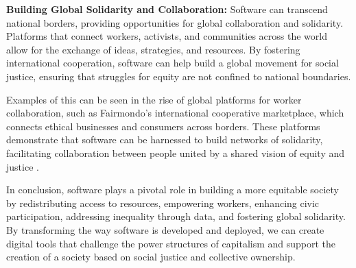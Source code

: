 \begin{refsection}
\textbf{Building Global Solidarity and Collaboration:}
Software can transcend national borders, providing opportunities for global collaboration and solidarity. Platforms that connect workers, activists, and communities across the world allow for the exchange of ideas, strategies, and resources. By fostering international cooperation, software can help build a global movement for social justice, ensuring that struggles for equity are not confined to national boundaries.

Examples of this can be seen in the rise of global platforms for worker collaboration, such as Fairmondo’s international cooperative marketplace, which connects ethical businesses and consumers across borders. These platforms demonstrate that software can be harnessed to build networks of solidarity, facilitating collaboration between people united by a shared vision of equity and justice \cite[pp.~119-122]{schwab2020}.

In conclusion, software plays a pivotal role in building a more equitable society by redistributing access to resources, empowering workers, enhancing civic participation, addressing inequality through data, and fostering global solidarity. By transforming the way software is developed and deployed, we can create digital tools that challenge the power structures of capitalism and support the creation of a society based on social justice and collective ownership.

\printbibliography[heading=subbibliography]
\end{refsection}